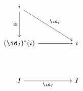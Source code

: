 \[\begin{tikzcd}
	i \\
	\\
	{(\id_{I})^{*}(i)} && i \\
	\\
	I && I
	\arrow["{\id_{I}}"', from=5-1, to=5-3]
	\arrow[from=3-1, to=3-3]
	\arrow["{\id_{i}}", from=1-1, to=3-3]
	\arrow["\iso"', from=1-1, to=3-1]
\end{tikzcd}\]